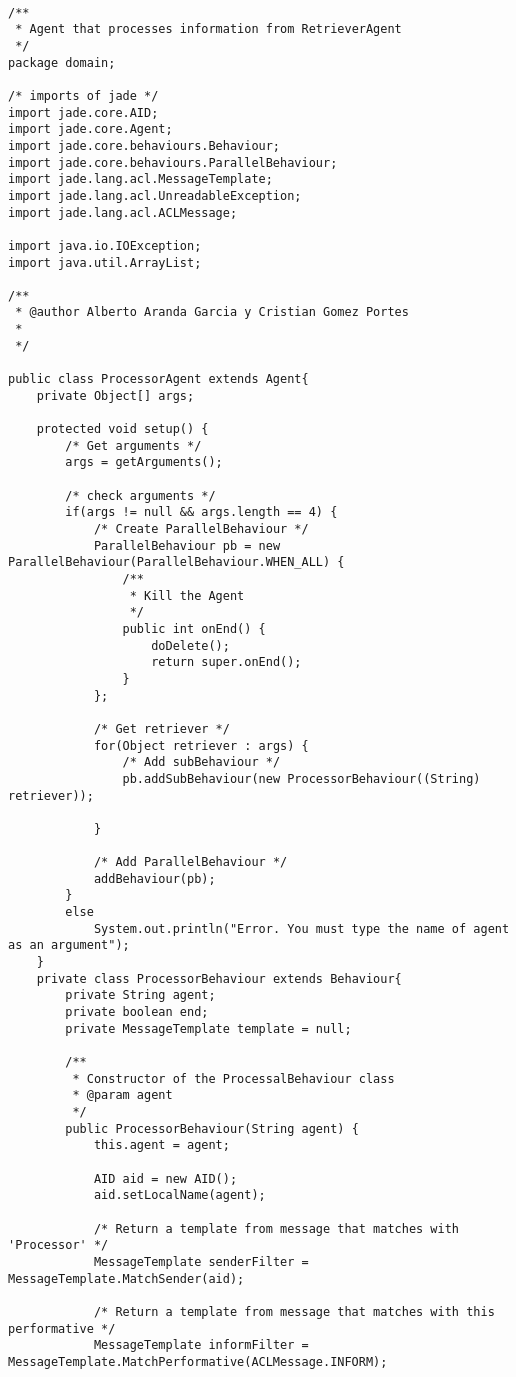 \documentclass{pre-tfg}
\begin{document}
\begin{lstlisting}[caption=Código de extracción de anuncios de varios links de una URL,style=java]

/**
 * Agent that processes information from RetrieverAgent
 */
package domain;

/* imports of jade */
import jade.core.AID;
import jade.core.Agent;
import jade.core.behaviours.Behaviour;
import jade.core.behaviours.ParallelBehaviour;
import jade.lang.acl.MessageTemplate;
import jade.lang.acl.UnreadableException;
import jade.lang.acl.ACLMessage;

import java.io.IOException;
import java.util.ArrayList;

/**
 * @author Alberto Aranda Garcia y Cristian Gomez Portes
 *
 */

public class ProcessorAgent extends Agent{
	private Object[] args;

	protected void setup() {
		/* Get arguments */
		args = getArguments();

		/* check arguments */
		if(args != null && args.length == 4) {
			/* Create ParallelBehaviour */
			ParallelBehaviour pb = new ParallelBehaviour(ParallelBehaviour.WHEN_ALL) {
				/**
				 * Kill the Agent
				 */
				public int onEnd() {
					doDelete();
					return super.onEnd();
				}
			};

			/* Get retriever */
			for(Object retriever : args) {
				/* Add subBehaviour */
				pb.addSubBehaviour(new ProcessorBehaviour((String) retriever));

			}
			
			/* Add ParallelBehaviour */
			addBehaviour(pb);
		}
		else
			System.out.println("Error. You must type the name of agent as an argument");
	}
	private class ProcessorBehaviour extends Behaviour{
		private String agent;
		private boolean end;
		private MessageTemplate template = null;

		/**
		 * Constructor of the ProcessalBehaviour class
		 * @param agent
		 */
		public ProcessorBehaviour(String agent) {
			this.agent = agent;

			AID aid = new AID();
			aid.setLocalName(agent);

			/* Return a template from message that matches with 'Processor' */
			MessageTemplate senderFilter = MessageTemplate.MatchSender(aid);

			/* Return a template from message that matches with this performative */
			MessageTemplate informFilter = MessageTemplate.MatchPerformative(ACLMessage.INFORM);


\end{lstlisting}
\end{document}
